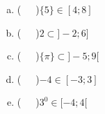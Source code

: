 \documentclass[a4paper,14pt]{article}
\begin{document}
\begin{multicols}{2}
\begin{enumerate}
             \begin{enumerate}[a)]
             	\item (~~~)$\{5\} \in [4; 8]$
             	\item (~~~)$2 \subset ]-2; 6]$
             	\item (~~~)$\{\pi\} \subset ]-5; 9[$
             	\item (~~~)$-4 \in [-3; 3]$
             	\item (~~~)$3^0 \in [-4; 4[$
            \end{enumerate}	
		\end{enumerate}
	$~$ \\ $~$ \\ $~$ \\ $~$ \\ $~$ \\ $~$ \\ $~$ \\ $~$ \\ $~$ \\ $~$ \\ $~$ \\ $~$ \\ $~$ \\ $~$ \\ $~$ \\ $~$ \\ $~$ \\ $~$ \\ $~$ \\ $~$ \\ $~$ \\ $~$ \\ $~$ \\ $~$ \\ $~$ \\ $~$ \\ $~$ \\ $~$ \\ $~$ \\ $~$ \\ $~$ \\ $~$ \\ $~$ \\ $~$ \\ $~$ \\ $~$ \\ $~$ \\ $~$ \\ $~$ \\ $~$ \\ $~$ \\ $~$ \\ $~$ \\ $~$ \\ $~$ \\ $~$ \\ $~$ \\ $~$ \\
    \end{multicols}
\end{document}
